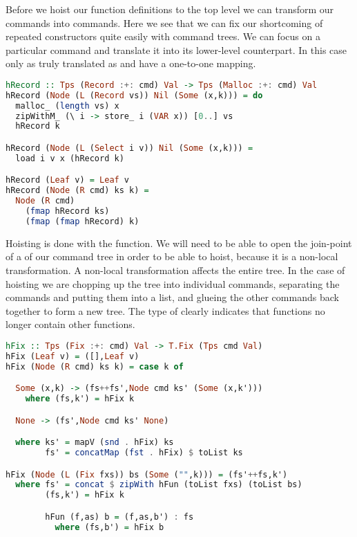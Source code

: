 Before we hoist our function definitions to the top level we can transform our  commands into  commands. Here we see that we can fix our shortcoming of repeated constructors quite easily with command trees. We can focus on a particular command and translate it into its lower-level counterpart. In this case only  as truly translated as  and  have a one-to-one mapping.

\begin{lstlisting}[language=Haskell]
hRecord :: Tps (Record :+: cmd) Val -> Tps (Malloc :+: cmd) Val
hRecord (Node (L (Record vs)) Nil (Some (x,k))) = do
  malloc_ (length vs) x
  zipWithM_ (\ i -> store_ i (VAR x)) [0..] vs
  hRecord k

hRecord (Node (L (Select i v)) Nil (Some (x,k))) =
  load i v x (hRecord k)

hRecord (Leaf v) = Leaf v
hRecord (Node (R cmd) ks k) =
  Node (R cmd)
    (fmap hRecord ks)
    (fmap (fmap hRecord) k)
\end{lstlisting}

Hoisting is done with the  function. We will need to be able to open the join-point of a  of our command tree in order to be able to hoist, because it is a non-local transformation. A non-local transformation affects the entire tree. In the case of hoisting we are chopping up the tree into individual commands, separating the  commands and putting them into a list, and glueing the other commands back together to form a new tree. The type of  clearly indicates that functions no longer contain other functions.

\begin{lstlisting}[language=Haskell]
hFix :: Tps (Fix :+: cmd) Val -> T.Fix (Tps cmd Val)
hFix (Leaf v) = ([],Leaf v)
hFix (Node (R cmd) ks k) = case k of

  Some (x,k) -> (fs++fs',Node cmd ks' (Some (x,k')))
    where (fs,k') = hFix k

  None -> (fs',Node cmd ks' None)

  where ks' = mapV (snd . hFix) ks
        fs' = concatMap (fst . hFix) $ toList ks

hFix (Node (L (Fix fxs)) bs (Some ("",k))) = (fs'++fs,k')
  where fs' = concat $ zipWith hFun (toList fxs) (toList bs)
        (fs,k') = hFix k

        hFun (f,as) b = (f,as,b') : fs
          where (fs,b') = hFix b
\end{lstlisting}

